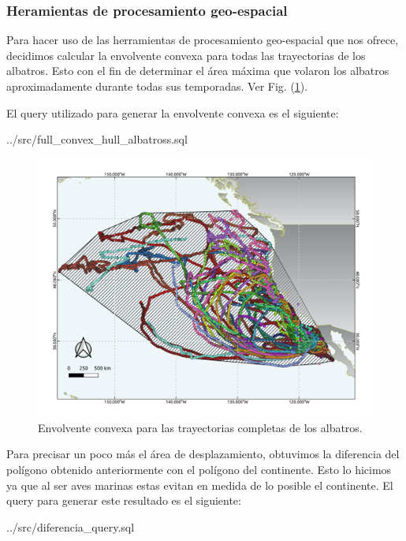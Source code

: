 \subsubsection{Heramientas de procesamiento geo-espacial}

Para hacer uso de las herramientas de procesamiento geo-espacial que nos ofrece,
decidimos calcular la envolvente convexa para todas las trayectorias de los
albatros. Esto con el fin de determinar el área máxima que volaron los albatros
aproximadamente durante todas sus temporadas. Ver Fig. (\ref{fig:fullConvexHull}).

El query utilizado para generar la envolvente convexa es el siguiente:

 {../src/full_convex_hull_albatross.sql}

\begin{figure}[h]
    \centering
    \includegraphics[scale=0.60]{figures/fullConvexHull.png}
    \caption{Envolvente convexa para las trayectorias completas de los albatros.}
    \label{fig:fullConvexHull}
\end{figure}

Para precisar un poco más el área de desplazamiento, obtuvimos la diferencia del
polígono obtenido anteriormente con el polígono del continente. Esto lo hicimos
ya que al ser aves marinas estas evitan en medida de lo posible el continente.
El query para generar este resultado es el siguiente:

 {../src/diferencia_query.sql}

